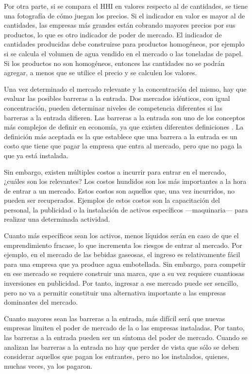 \documentclass[
  12pt,
  spanish,
]{book}
\begin{document}
Por otra parte, si se compara el HHI en valores respecto al de
cantidades, se tiene una fotografía de cómo juegan los precios. Si el
indicador en valor es mayor al de cantidades, las empresas más grandes
están cobrando mayores precios por sus productos, lo que es otro
indicador de poder de mercado. El indicador de cantidades producidas
debe construirse para productos homogéneos, por ejemplo si se calcula el
volumen de agua vendido en el mercado o las toneladas de papel. Si los
productos no son homogéneos, entonces las cantidades no se podrán
agregar, a menos que se utilice el precio y se calculen los valores.

Una vez determinado el mercado relevante y la concentración del mismo,
hay que evaluar las posibles barreras a la entrada. Dos mercados
idénticos, con igual concentración, pueden determinar niveles de
competencia diferentes si las barreras a la entrada difieren. Las
barreras a la entrada son uno de los conceptos más complejos de definir
en economía, ya que existen diferentes definiciones \citep{McAfee2004}.
La definición más aceptada es la que establece que una barrera a la
entrada es un costo que tiene que pagar la empresa que entra al mercado,
pero que no paga la que ya está instalada.

Sin embargo, existen múltiples costos a incurrir para entrar en el
mercado, ¿cuáles son los relevantes? Los costos hundidos son los más
importantes a la hora de entrar a un mercado. Estos costos son aquellos
que, una vez incurridos, no pueden ser recuperados. Ejemplos de estos
costos son la capacitación del personal, la publicidad o la instalación
de activos específicos ---maquinaria--- para realizar una determinada
actividad.

Cuanto más específicos sean los activos, menos líquidos serán en caso de
que el emprendimiento fracase, lo que incrementa los riesgos de entrar
al mercado. Por ejemplo, en el mercado de las bebidas gaseosas, el
ingreso es relativamente fácil para una empresa que ya produce agua
embotellada. Sin embargo, para competir en ese mercado se requiere
construir una marca, que a su vez requiere cuantiosas inversiones en
publicidad. Por tanto, ingresar a ese mercado puede ser sencillo, pero
no va a permitir constituir una alternativa importante a las empresas
dominantes del mercado.

Cuanto mayores sean las barreras a la entrada, más difícil será que
nuevas empresas limiten el poder de mercado de la o las empresas
instaladas. Por tanto, las barreras a la entrada pueden ser un síntoma
del poder de mercado. Cuando se analizan las barreras a la entrada no
hay que perder de vista que sólo se deben considerar aquellos que pagan
los entrantes, pero no los instalados, quienes, muchas veces, ya los
pagaron.
\end{document}
